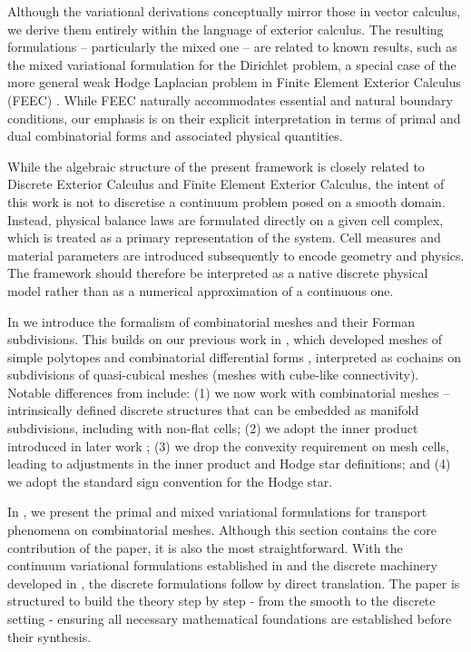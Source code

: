 \documentclass{elsarticle}
\theoremstyle{definition}
\begin{document}
Although the variational derivations conceptually mirror those in vector calculus, we derive them entirely within the language of exterior calculus. The resulting formulations -- particularly the mixed one -- are related to known results, such as the mixed variational formulation for the Dirichlet problem, a special case of the more general weak Hodge Laplacian problem in Finite Element Exterior Calculus (FEEC) \cite[Chapter 8]{arnold2018finite}.
While FEEC naturally accommodates essential and natural boundary conditions, our
emphasis is on their explicit interpretation in terms of primal and dual
combinatorial forms and associated physical quantities.

While the algebraic structure of the present framework is closely related to
Discrete Exterior Calculus and Finite Element Exterior Calculus, the intent of
this work is not to discretise a continuum problem posed on a smooth domain.
Instead, physical balance laws are formulated directly on a given cell complex,
which is treated as a primary representation of the system.
Cell measures and material parameters are introduced subsequently to encode
geometry and physics.
The framework should therefore be interpreted as a native discrete physical
model rather than as a numerical approximation of a continuous one.

In  we introduce the formalism of combinatorial meshes and their Forman subdivisions. This builds on our previous work in \cite{berbatov2022diffusion}, which developed meshes of simple polytopes and combinatorial differential forms \cite{forman2002combinatorial}, interpreted as cochains on subdivisions of quasi-cubical meshes (meshes with cube-like connectivity). Notable differences from \cite{berbatov2022diffusion} include: (1) we now work with combinatorial meshes -- intrinsically defined discrete structures that can be embedded as manifold subdivisions, including with non-flat cells; (2) we adopt the inner product introduced in later work \cite{berbatov2023discrete}; (3) we drop the convexity requirement on mesh cells, leading to adjustments in the inner product and Hodge star definitions; and (4) we adopt the standard sign convention for the Hodge star.

In , we present the primal and mixed variational formulations for transport phenomena on combinatorial meshes. Although this section contains the core contribution of the paper, it is also the most straightforward. With the continuum variational formulations established in  and the discrete machinery developed in , the discrete formulations follow by direct translation. The paper is structured to build the theory step by step - from the smooth to the discrete setting - ensuring all necessary mathematical foundations are established before their synthesis.
\end{document}
